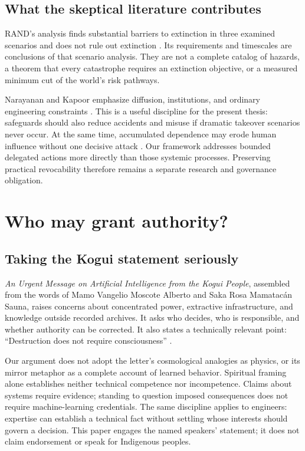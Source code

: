 \documentclass[10pt,twocolumn,letterpaper]{article}
\begin{document}
\subsection{What the skeptical literature contributes}
RAND's analysis finds substantial barriers to extinction in three examined scenarios and does not rule out extinction \cite{rand}. Its requirements and timescales are conclusions of that scenario analysis. They are not a complete catalog of hazards, a theorem that every catastrophe requires an extinction objective, or a measured minimum cut of the world's risk pathways.

Narayanan and Kapoor emphasize diffusion, institutions, and ordinary engineering constraints \cite{normal}. This is a useful discipline for the present thesis: safeguards should also reduce accidents and misuse if dramatic takeover scenarios never occur. At the same time, accumulated dependence may erode human influence without one decisive attack \cite{gradual}. Our framework addresses bounded delegated actions more directly than those systemic processes. Preserving practical revocability therefore remains a separate research and governance obligation.


\section{Who may grant authority?}
\label{sec:legitimacy}

\subsection{Taking the Kogui statement seriously}
\emph{An Urgent Message on Artificial Intelligence from the Kogui People}, assembled from the words of Mamo Vangelio Moscote Alberto and Saka Rosa Mamatac\'an Sauna, raises concerns about concentrated power, extractive infrastructure, and knowledge outside recorded archives. It asks who decides, who is responsible, and whether authority can be corrected. It also states a technically relevant point: ``Destruction does not require consciousness'' \cite[pp.~1--4, 10--14]{kogui}.

Our argument does not adopt the letter's cosmological analogies as physics, or its mirror metaphor as a complete account of learned behavior. Spiritual framing alone establishes neither technical competence nor incompetence. Claims about systems require evidence; standing to question imposed consequences does not require machine-learning credentials. The same discipline applies to engineers: expertise can establish a technical fact without settling whose interests should govern a decision. This paper engages the named speakers' statement; it does not claim endorsement or speak for Indigenous peoples.
\end{document}
